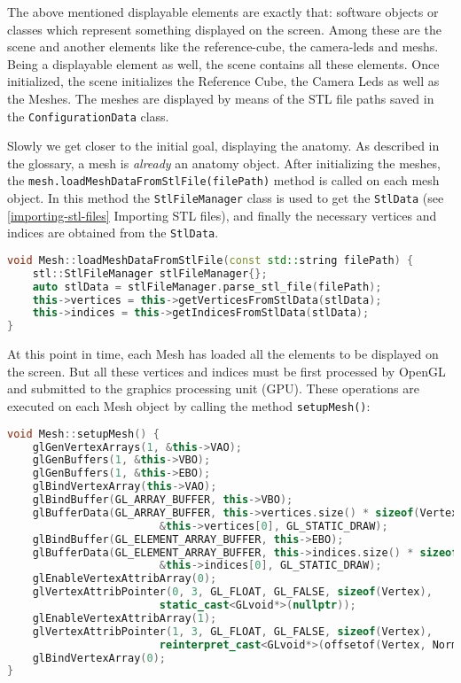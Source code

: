 The above mentioned displayable elements are exactly that: software objects or classes which represent something displayed on the screen. Among these are the \Gls{scene} and another elements like the \gls{reference-cube}, the \gls{camera-leds} and \glspl{mesh}. Being a displayable element as well, the scene contains all these elements. Once initialized, the scene initializes the Reference Cube, the Camera Leds as well as the Meshes. The meshes are displayed by means of the STL file paths saved in the \verb|ConfigurationData| class.

Slowly we get closer to the initial goal, displaying the anatomy. As described in the glossary, a \gls{mesh} is \emph{already} an anatomy object. After initializing the meshes, the \verb|mesh.loadMeshDataFromStlFile(filePath)| method is called on each mesh object. In this method the \verb|StlFileManager| class is used to get the \verb|StlData| (see \ref{importing-stl-files} Importing STL files), and finally the necessary vertices and indices are obtained from the \verb|StlData|.

\begin{lstlisting}[language=C++, caption={Loading Mesh data from Stl files}]
void Mesh::loadMeshDataFromStlFile(const std::string filePath) {
	stl::StlFileManager stlFileManager{};
	auto stlData = stlFileManager.parse_stl_file(filePath);
	this->vertices = this->getVerticesFromStlData(stlData);
	this->indices = this->getIndicesFromStlData(stlData);
}	
\end{lstlisting}
At this point in time, each Mesh has loaded all the elements to be displayed on the screen. But all these vertices and indices must be first processed by OpenGL and submitted to the graphics processing unit (GPU). These operations are executed on each Mesh object by calling the method \verb|setupMesh()|:

\begin{lstlisting}[language=C++,caption={Setting up a Mesh}]
void Mesh::setupMesh() {
	glGenVertexArrays(1, &this->VAO);
	glGenBuffers(1, &this->VBO);
	glGenBuffers(1, &this->EBO);
	glBindVertexArray(this->VAO);
	glBindBuffer(GL_ARRAY_BUFFER, this->VBO);
	glBufferData(GL_ARRAY_BUFFER, this->vertices.size() * sizeof(Vertex), 
						&this->vertices[0], GL_STATIC_DRAW);
	glBindBuffer(GL_ELEMENT_ARRAY_BUFFER, this->EBO);
	glBufferData(GL_ELEMENT_ARRAY_BUFFER, this->indices.size() * sizeof(GLuint), 
						&this->indices[0], GL_STATIC_DRAW);
	glEnableVertexAttribArray(0);
	glVertexAttribPointer(0, 3, GL_FLOAT, GL_FALSE, sizeof(Vertex), 
						static_cast<GLvoid*>(nullptr));
	glEnableVertexAttribArray(1);
	glVertexAttribPointer(1, 3, GL_FLOAT, GL_FALSE, sizeof(Vertex), 
						reinterpret_cast<GLvoid*>(offsetof(Vertex, Normal)));
	glBindVertexArray(0);
}
\end{lstlisting}


